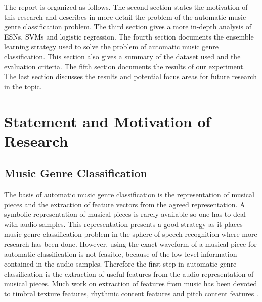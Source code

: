 \documentclass[a4paper,11pt,oneside]{article}
\begin{document}
The report is organized as follows. The second section states the motivation of this research
and describes in more detail the problem of the automatic music genre classification problem.
The third section gives a more in-depth analysis of ESNs, SVMs and logistic regression.
The fourth section documents the ensemble learning strategy used to solve the problem of automatic
music genre classification. This section also gives a summary of the dataset used and the evaluation criteria.
The fifth section documents the results of our experiment. The last section discusses the results and potential 
focus areas for future research in the topic.
\section{Statement and Motivation of Research}
\subsection{Music Genre Classification}
The basis of automatic music genre classification is the representation of musical pieces and the extraction
of feature vectors from the agreed representation. A symbolic representation of musical pieces is rarely available
so one has to deal with audio samples. This representation presents a good strategy as it places music genre 
classification problem in the sphere of speech recognition where more research has been done. However, using the
exact waveform of a musical piece for automatic classification is not feasible, because of the low level information 
contained in the audio samples. Therefore the first step in automatic genre classification is the extraction of useful 
features from the audio representation of musical pieces. Much work on extraction of features from music has been 
devoted to timbral texture features, rhythmic content features and pitch content features \cite{ogihara}.
\end{document}
